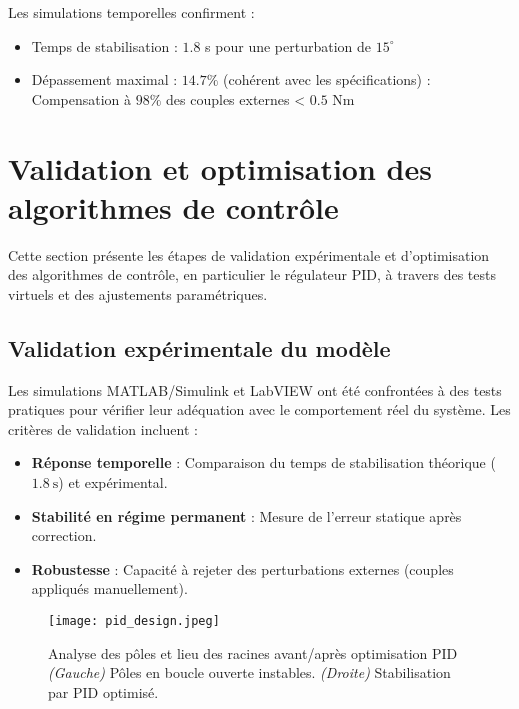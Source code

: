 \documentclass{report}
\begin{document}
Les simulations temporelles confirment :
\begin{itemize}
    \item Temps de stabilisation : $1.8$ s pour une perturbation de $15^\circ$
    \item Dépassement maximal : $14.7\%$ (cohérent avec les spécifications)
     : Compensation à $98\%$ des couples externes < $0.5$ Nm
\end{itemize}
\section{Validation et optimisation des algorithmes de contrôle}
\label{sec:controle_optim}

Cette section présente les étapes de validation expérimentale et d'optimisation des algorithmes de contrôle, en particulier le régulateur PID, à travers des tests virtuels et des ajustements paramétriques.

\subsection{Validation expérimentale du modèle}
\label{subsec:validation}

Les simulations MATLAB/Simulink et LabVIEW ont été confrontées à des tests pratiques pour vérifier leur adéquation avec le comportement réel du système. Les critères de validation incluent :

\begin{itemize}
    \item \textbf{Réponse temporelle} : Comparaison du temps de stabilisation théorique ($1.8\ \text{s}$) et expérimental.
    \item \textbf{Stabilité en régime permanent} : Mesure de l'erreur statique après correction.
    \item \textbf{Robustesse} : Capacité à rejeter des perturbations externes (couples appliqués manuellement).
\end{itemize}

\begin{figure}[htbp]
    \centering
    \texttt{[image: pid\_design.jpeg]}
    \caption{Analyse des pôles et lieu des racines avant/après optimisation PID \\
    \small\textit{(Gauche)} Pôles en boucle ouverte instables. \textit{(Droite)} Stabilisation par PID optimisé.}
    \label{fig:pid_optim}
\end{figure}
\end{document}
